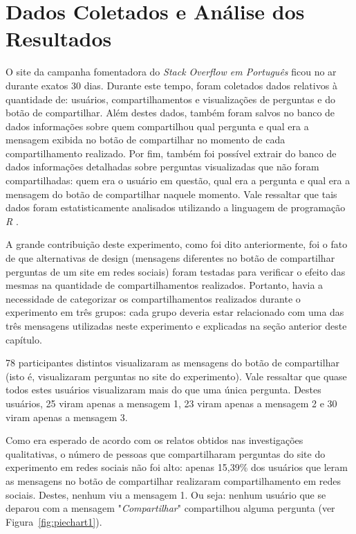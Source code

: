 \section{Dados Coletados e Análise dos Resultados}
O site da campanha fomentadora do \textit{Stack Overflow em Português} ficou no ar durante exatos 30 dias. Durante este tempo, foram coletados dados relativos à quantidade de: usuários, compartilhamentos e visualizações de perguntas e do botão de compartilhar. Além destes dados, também foram salvos no banco de dados informações sobre quem compartilhou qual pergunta e qual era a mensagem exibida no botão de compartilhar no momento de cada compartilhamento realizado. Por fim, também foi possível extrair do banco de dados informações detalhadas sobre perguntas visualizadas que não foram compartilhadas: quem era o usuário em questão, qual era a pergunta e qual era a mensagem do botão de compartilhar naquele momento. Vale ressaltar que tais dados foram estatisticamente analisados utilizando a linguagem de programação \textit{R} \cite{chapman2015overview}.

A grande contribuição deste experimento, como foi dito anteriormente, foi o fato de que alternativas de design (mensagens diferentes no botão de compartilhar perguntas de um site \qa em redes sociais) foram testadas para verificar o efeito das mesmas na quantidade de compartilhamentos realizados. Portanto, havia a necessidade de categorizar os compartilhamentos realizados durante o experimento em três grupos: cada grupo deveria estar relacionado com uma das três mensagens utilizadas neste experimento e explicadas na seção anterior deste capítulo.

78 participantes distintos visualizaram as mensagens do botão de compartilhar (isto é, visualizaram perguntas no site do experimento). Vale ressaltar  que quase todos estes usuários visualizaram mais do que uma única pergunta. Destes usuários, 25 viram apenas a mensagem 1, 23 viram apenas a mensagem 2 e 30 viram apenas a mensagem 3. 

Como era esperado de acordo com os relatos obtidos nas investigações qualitativas, o número de pessoas que compartilharam perguntas do site do experimento em redes sociais não foi alto: apenas 15,39\% dos usuários que leram as mensagens no botão de compartilhar realizaram compartilhamento em redes sociais. Destes, nenhum viu a mensagem 1. Ou seja: nenhum usuário que se deparou com a mensagem "\textit{Compartilhar}" compartilhou alguma pergunta (ver Figura~\ref{fig:piechart1}).


